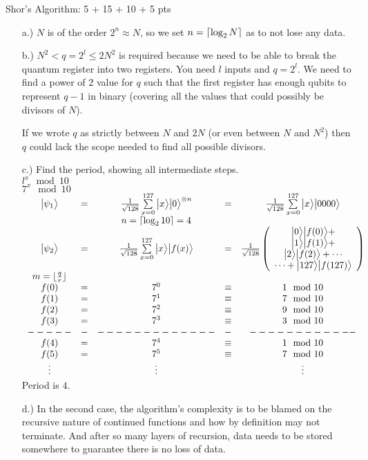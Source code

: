 \documentclass[12pt]{article}
\makeatletter
\newcommand{\<}{\langle}
\renewcommand{\>}{\rangle}
\newenvironment{problem}{\@startsection
       {section}
       {1}
       {-.2em}
       {-3.5ex plus -1ex minus -.2ex}
       {2.3ex plus .2ex}
       {\pagebreak[3]
       \large\bf\noindent{Problem }
       }
       }
       {%
       \begin{center}\large\bf \end{center}}
\DeclarePairedDelimiter\ceil{\lceil}{\rceil}
\DeclarePairedDelimiter\floor{\lfloor}{\rfloor}
\def\ket#1{\big|{#1}\big>}
\makeatother
\begin{document}
\begin{problem}{Shor's Algorithm: 5 + 15 + 10 + 5 pts}
\begin{enumerate}
\item[a.)] $N$ is of the order $2^n \approx N$, so we set $n = \ceil{\log_2N}$ as to not lose any data. 

\item[b.)] $N^2 < q = 2^l \leq 2N^2$ is required because we need to be able to break the quantum register into two registers. You need $l$ inputs and $q = 2^l$. We need to find a power of $2$ value for $q$ such that the first register has enough qubits to represent $q-1$ in binary (covering all the values that could possibly be divisors of $N$).

If we wrote $q$ as strictly between $N$ and $2N$ (or even between $N$ and $N^2$) then $q$ could lack the scope needed to find all possible divisors.
\newpage
\item[c.)] Find the period, showing all intermediate steps.\\
$l^x \mod 10$\\ $7^x \mod 10$\\
$
\begin{array}{ccccc}
\ket{\psi_1} &=& \frac{1}{\sqrt{128}}\sum\limits_{x = 0}^{127} \ket{x}\ket{0}^{\otimes n} &=& \frac{1}{\sqrt{128}}\sum\limits_{x = 0}^{127} \ket{x}\ket{0000}\\
&& n = \ceil{\log_2 10} = 4\\
\ket{\psi_2} &=& \frac{1}{\sqrt{128}}\sum\limits_{x = 0}^{127} \ket{x}\ket{f(x)} &=& \frac{1}{\sqrt{128}}\left(\begin{array}{c}
\ket{0}\ket{f(0)} + \\
\ket{1}\ket{f(1)} + \\
\ket{2}\ket{f(2)} + \cdots\\
\cdots + \ket{127}\ket{f(127)} 
\end{array}\right)\\
m = \floor{\frac{q}{r}}\\
f(0) &=& 7^0 &\equiv& 1 \mod 10\\
f(1) &=& 7^1 &\equiv& 7 \mod 10\\
f(2) &=& 7^2 &\equiv& 9 \mod 10\\
f(3) &=& 7^3 &\equiv& 3 \mod 10\\
-----&-&-------------&-&------------\\
f(4) &=& 7^4 &\equiv& 1 \mod 10\\
f(5) &=& 7^5 &\equiv& 7 \mod 10\\
\vdots&&\vdots&&\vdots\\
\end{array}
$\\
Period is $4$.

\item[d.)] In the second case, the algorithm's complexity is to be blamed on the recursive nature of continued functions and how by definition may not terminate. And after so many layers of recursion, data needs to be stored somewhere to guarantee there is no loss of data.
\end{enumerate}
\end{problem}
\newpage
\end{document}
